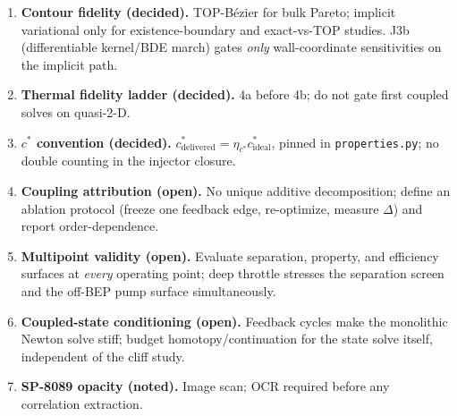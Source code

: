 \documentclass[11pt]{article}
\newcommand{\cmd}[1]{\nolinkurl{#1}}
\newcommand{\cstar}{c^{*}}
\begin{document}
\begin{enumerate}[leftmargin=1.5em,itemsep=3pt]
\item \textbf{Contour fidelity (decided).} TOP-B\'ezier for bulk Pareto;
implicit variational only for existence-boundary and exact-vs-TOP studies. J3b
(differentiable kernel/BDE march) gates \emph{only} wall-coordinate sensitivities
on the implicit path.
\item \textbf{Thermal fidelity ladder (decided).} 4a before 4b; do not gate first
coupled solves on quasi-2-D.
\item \textbf{$\cstar$ convention (decided).} $\cstar_\mathrm{delivered}=\eta_{\cstar}\cstar_\mathrm{ideal}$,
pinned in \cmd{properties.py}; no double counting in the injector closure.
\item \textbf{Coupling attribution (open).} No unique additive decomposition;
define an ablation protocol (freeze one feedback edge, re-optimize, measure
$\Delta$) and report order-dependence.
\item \textbf{Multipoint validity (open).} Evaluate separation, property, and
efficiency surfaces at \emph{every} operating point; deep throttle stresses the
separation screen and the off-BEP pump surface simultaneously.
\item \textbf{Coupled-state conditioning (open).} Feedback cycles make the
monolithic Newton solve stiff; budget homotopy/continuation for the state solve
itself, independent of the cliff study.
\item \textbf{SP-8089 opacity (noted).} Image scan; OCR required before any
correlation extraction.
\end{enumerate}
\end{document}
